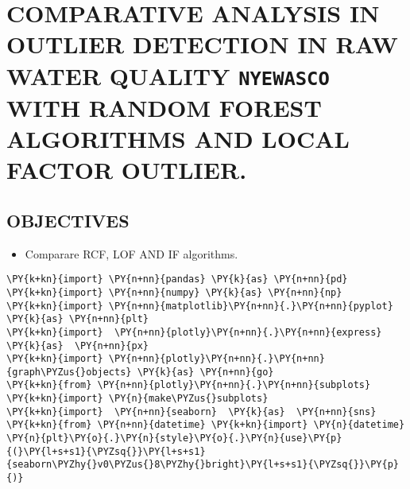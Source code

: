 
    
    \hypertarget{comparative-analysis-in-outlier-detection-in-raw-water-quality-nyewasco-with-random-forest-algorithms-and-local-factor-outlier.}{%
\section{\texorpdfstring{COMPARATIVE ANALYSIS IN OUTLIER DETECTION IN
RAW WATER QUALITY \texttt{NYEWASCO} WITH RANDOM FOREST ALGORITHMS AND
LOCAL FACTOR
OUTLIER.}{COMPARATIVE ANALYSIS IN OUTLIER DETECTION IN RAW WATER QUALITY NYEWASCO WITH RANDOM FOREST ALGORITHMS AND LOCAL FACTOR OUTLIER.}}\label{comparative-analysis-in-outlier-detection-in-raw-water-quality-nyewasco-with-random-forest-algorithms-and-local-factor-outlier.}}

\hypertarget{objectives}{%
\subsection{OBJECTIVES}\label{objectives}}

\begin{itemize}
\tightlist
\item
  Comparare RCF, LOF AND IF algorithms.
\end{itemize}

    \begin{tcolorbox}[breakable, size=fbox, boxrule=1pt, pad at break*=1mm,colback=cellbackground, colframe=cellborder]
\begin{Verbatim}[commandchars=\\\{\}]
\PY{k+kn}{import} \PY{n+nn}{pandas} \PY{k}{as} \PY{n+nn}{pd}
\PY{k+kn}{import} \PY{n+nn}{numpy} \PY{k}{as} \PY{n+nn}{np}
\PY{k+kn}{import} \PY{n+nn}{matplotlib}\PY{n+nn}{.}\PY{n+nn}{pyplot} \PY{k}{as} \PY{n+nn}{plt}
\PY{k+kn}{import}  \PY{n+nn}{plotly}\PY{n+nn}{.}\PY{n+nn}{express} \PY{k}{as}  \PY{n+nn}{px}
\PY{k+kn}{import} \PY{n+nn}{plotly}\PY{n+nn}{.}\PY{n+nn}{graph\PYZus{}objects} \PY{k}{as} \PY{n+nn}{go}
\PY{k+kn}{from} \PY{n+nn}{plotly}\PY{n+nn}{.}\PY{n+nn}{subplots} \PY{k+kn}{import} \PY{n}{make\PYZus{}subplots}
\PY{k+kn}{import}  \PY{n+nn}{seaborn}  \PY{k}{as}  \PY{n+nn}{sns}
\PY{k+kn}{from} \PY{n+nn}{datetime} \PY{k+kn}{import} \PY{n}{datetime}
\PY{n}{plt}\PY{o}{.}\PY{n}{style}\PY{o}{.}\PY{n}{use}\PY{p}{(}\PY{l+s+s1}{\PYZsq{}}\PY{l+s+s1}{seaborn\PYZhy{}v0\PYZus{}8\PYZhy{}bright}\PY{l+s+s1}{\PYZsq{}}\PY{p}{)}
\end{Verbatim}
\end{tcolorbox}

